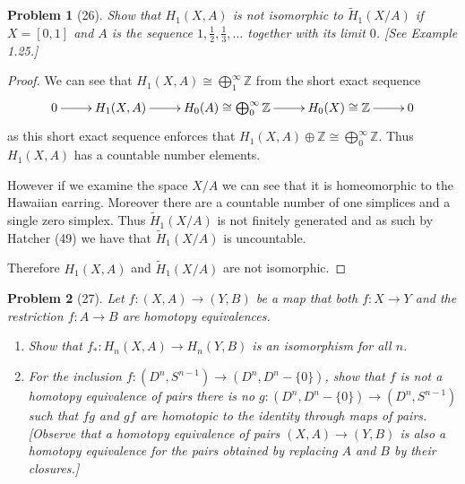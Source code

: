 \documentclass[10pt]{article}
\newcommand{\sk}{\vskip 10mm}
\newcommand{\bb}[1]{\mathbb{#1}}
\theoremstyle{plain}
\newtheorem{problem}{Problem}
\theoremstyle{remark}
\begin{document}
\sk

\begin{problem}[26]
  Show that $H_1(X,A)$ is not isomorphic to $\widetilde{H}_1(X/A)$ if
  $X=[0,1]$ and $A$ is the sequence $1,\frac{1}{2},\frac{1}{3},\ldots$
  together with its limit $0$. [See Example 1.25.]
\end{problem}

\begin{proof}
  We can see that $H_1(X,A)\cong\bigoplus_1^\infty\bb{Z}$ from the short exact sequence
  \[
    \xymatrix{
      0\ar[r] & H_1(X,A) \ar[r] & H_0(A)\cong \bigoplus_0^\infty\bb{Z} \ar[r] & H_0(X)\cong \bb{Z} \ar[r] & 0
    }
  \]
  as this short exact sequence enforces that $H_1(X,A)\oplus \bb{Z}\cong \bigoplus_0^\infty\bb{Z}$. Thus
  $H_1(X,A)$ has a countable number elements.

  However if we examine the space $X/A$ we can see that it is homeomorphic to the
  Hawaiian earring. Moreover there are a countable number of one simplices and
  a single zero simplex. Thus $\widetilde{H}_1(X/A)$ is not finitely generated
  and as such by Hatcher (49) we have that $\widetilde{H}_1(X/A)$ is uncountable.

  Therefore $H_1(X,A)$ and $\widetilde{H}_1(X/A)$ are not isomorphic.
\end{proof}

\sk

\begin{problem}[27]
  Let $f:(X,A)\rightarrow(Y,B)$ be a map that both $f:X\rightarrow Y$ and the restriction
  $f:A\rightarrow B$ are homotopy equivalences.
  \begin{enumerate}
  \item[(a)] Show that $f_*:H_n(X,A)\rightarrow H_n(Y,B)$ is an
    isomorphism for all $n$.
  \item[(b)] For the inclusion $f:(D^n,S^{n-1})\rightarrow(D^n,D^n-\{0\})$, show
    that $f$ is not a homotopy equivalence of pairs \textemdash there
    is no $g:(D^n,D^n-\{0\})\rightarrow(D^n,S^{n-1})$ such that $fg$
    and $gf$ are homotopic to the identity through maps of pairs.
    [Observe that a homotopy equivalence of pairs $(X,A)\rightarrow(Y,B)$
    is also a homotopy equivalence for the pairs obtained by
    replacing $A$ and $B$ by their closures.]
  \end{enumerate}
\end{problem}
\end{document}
